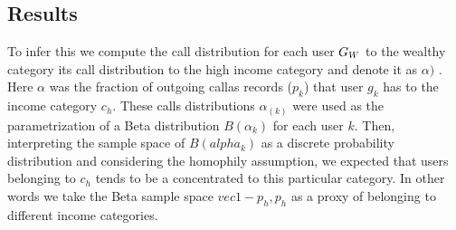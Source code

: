 \subsection{Results}


To infer this we compute the call distribution for each user $ \mathlarger{G}_W $ to the wealthy category its call distribution to the high income category and denote it as $\alpha)$ . Here $\alpha$ was the fraction of outgoing callas records ($p_k$) that user $g_k$ has to the income category $c_h$. These calls distributions $\alpha_{(k)}$ were used as the parametrization of a Beta distribution $B(\alpha_k)$ for each user $k$. Then, interpreting the sample space of $B(alpha_k)$ as a discrete probability distribution and considering the homophily assumption,  we expected that users belonging to $c_h$ tends to be a concentrated to this particular category. In other words we take the Beta sample space $vec{1-p_h,p_h}$ as a proxy of belonging to different income categories.


